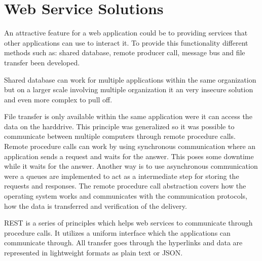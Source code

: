 \section{Web Service Solutions}
An attractive feature for a web application could be to providing services that other applications can use to interact it. To provide this functionality different methods such as: shared database, remote producer call, message bus and file transfer been developed.

Shared database can work for multiple applications within the same organization but on a larger scale involving multiple organization it an very insecure solution and even more complex to pull off.

File transfer is only available within the same application were it can access the data on the harddrive. This principle was generalized so it was possible to communicate between multiple computers through remote procedure calls. Remote procedure calls can work by using synchronous communication where an application sends a request and waits for the answer. This poses some downtime while it waits for the answer. Another way is to use asynchronous communication were a queues are implemented to act as a intermediate step for storing the requests and responses.
The remote procedure call abstraction covers how the operating system works and communicates with the communication protocols, how the data is transferred and verification of the delivery.

REST is a series of principles which helps web services to communicate through procedure calls. It utilizes a uniform interface which the applications can communicate through. All transfer goes through the hyperlinks and data are represented in lightweight formats as plain text or JSON.
